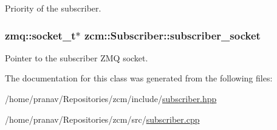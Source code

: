 Priority of the subscriber. 

\subsubsection[{\texorpdfstring{subscriber\+\_\+socket}{subscriber_socket}}]{\setlength{\rightskip}{0pt plus 5cm}zmq\+::socket\+\_\+t$\ast$ zcm\+::\+Subscriber\+::subscriber\+\_\+socket\hspace{0.3cm}{\ttfamily [private]}}\hypertarget{classzcm_1_1Subscriber_ab6b9ee85d97a209b7c370b90882ed028}{}\label{classzcm_1_1Subscriber_ab6b9ee85d97a209b7c370b90882ed028}


Pointer to the subscriber Z\+MQ socket. 



The documentation for this class was generated from the following files\+:\begin{DoxyCompactItemize}
\item 
/home/pranav/\+Repositories/zcm/include/\hyperlink{subscriber_8hpp}{subscriber.\+hpp}\item 
/home/pranav/\+Repositories/zcm/src/\hyperlink{subscriber_8cpp}{subscriber.\+cpp}\end{DoxyCompactItemize}
